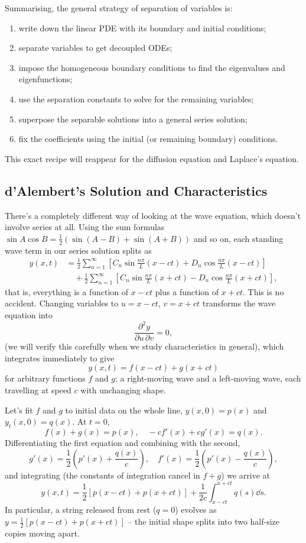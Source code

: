 \documentclass[a4paper]{scrartcl}
\begin{document}
Summarising, the general strategy of separation of variables is:
\begin{enumerate}
    \item write down the linear PDE with its boundary and initial conditions;
    \item separate variables to get decoupled ODEs;
    \item impose the homogeneous boundary conditions to find the eigenvalues and eigenfunctions;
    \item use the separation constants to solve for the remaining variables;
    \item superpose the separable solutions into a general series solution;
    \item fix the coefficients using the initial (or remaining boundary) conditions.
\end{enumerate}
This exact recipe will reappear for the diffusion equation and Laplace's equation.

\subsection{d'Alembert's Solution and Characteristics}

There's a completely different way of looking at the wave equation, which doesn't involve series at all. Using the sum formulas $\sin A \cos B = \frac{1}{2}(\sin(A - B) + \sin(A + B))$ and so on, each standing wave term in our series solution splits as
\begin{align*}
    y(x, t) &= \frac{1}{2}\sum_{n = 1}^{\infty} \left[C_n \sin \frac{n \pi}{L}(x - ct) + D_n \cos \frac{n \pi}{L}(x - ct)\right] \\
    &\quad + \frac{1}{2}\sum_{n = 1}^{\infty} \left[C_n \sin \frac{n \pi}{L}(x + ct) - D_n \cos \frac{n \pi}{L}(x + ct)\right],
\end{align*}
that is, everything is a function of $x - ct$ plus a function of $x + ct$. This is no accident. Changing variables to $u = x - ct$, $v = x + ct$ transforms the wave equation into
$$
\frac{\partial^2 y}{\partial u \, \partial v} = 0,
$$
(we will verify this carefully when we study characteristics in general), which integrates immediately to give
$$
y(x, t) = f(x - ct) + g(x + ct)
$$
for arbitrary functions $f$ and $g$: a right-moving wave and a left-moving wave, each travelling at speed $c$ with unchanging shape.

Let's fit $f$ and $g$ to initial data on the whole line, $y(x, 0) = p(x)$ and $y_t(x, 0) = q(x)$. At $t = 0$,
$$
f(x) + g(x) = p(x), \quad -c f'(x) + c g'(x) = q(x).
$$
Differentiating the first equation and combining with the second,
$$
g'(x) = \frac{1}{2}\left(p'(x) + \frac{q(x)}{c}\right), \quad f'(x) = \frac{1}{2}\left(p'(x) - \frac{q(x)}{c}\right),
$$
and integrating (the constants of integration cancel in $f + g$) we arrive at 
$$
y(x, t) = \frac{1}{2}\left[p(x - ct) + p(x + ct)\right] + \frac{1}{2c} \int_{x - ct}^{x + ct} q(s) \dd s.
$$
In particular, a string released from rest ($q = 0$) evolves as $y = \frac{1}{2}[p(x - ct) + p(x + ct)]$ -- the initial shape splits into two half-size copies moving apart.
\end{document}
